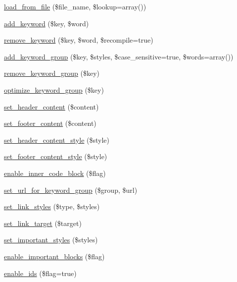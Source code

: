 \begin{DoxyCompactItemize}
\item 
\hyperlink{class_ge_s_hi_ad78f694615e13053f89adffc2071250b}{load\-\_\-from\-\_\-file} (\$file\-\_\-name, \$lookup=array())
\item 
\hyperlink{class_ge_s_hi_ac6087d66b751a4239978b3ea1877246b}{add\-\_\-keyword} (\$key, \$word)
\item 
\hyperlink{class_ge_s_hi_aa021fcab0b8139c61f80ea485b8743ed}{remove\-\_\-keyword} (\$key, \$word, \$recompile=true)
\item 
\hyperlink{class_ge_s_hi_aa07f57bc129fb6d2bffb53e656fab657}{add\-\_\-keyword\-\_\-group} (\$key, \$styles, \$case\-\_\-sensitive=true, \$words=array())
\item 
\hyperlink{class_ge_s_hi_a80aba8251ea481e8ccc4289b7b3eba09}{remove\-\_\-keyword\-\_\-group} (\$key)
\item 
\hyperlink{class_ge_s_hi_a3d0ad9c4da51c320af7b240581ac76a9}{optimize\-\_\-keyword\-\_\-group} (\$key)
\item 
\hyperlink{class_ge_s_hi_a6ffaf3c684a94262430cb9a763147f36}{set\-\_\-header\-\_\-content} (\$content)
\item 
\hyperlink{class_ge_s_hi_aa03a1a04e1f5bb5e00ba870e09bc67c5}{set\-\_\-footer\-\_\-content} (\$content)
\item 
\hyperlink{class_ge_s_hi_adbcebdc222d913879a754ebbf751e39e}{set\-\_\-header\-\_\-content\-\_\-style} (\$style)
\item 
\hyperlink{class_ge_s_hi_a849d6d82270ec99f74ef5bb62cba968a}{set\-\_\-footer\-\_\-content\-\_\-style} (\$style)
\item 
\hyperlink{class_ge_s_hi_ad12d3cb03360b860a4a3f94fcf8cb773}{enable\-\_\-inner\-\_\-code\-\_\-block} (\$flag)
\item 
\hyperlink{class_ge_s_hi_a331d88c29e6c2741777e8974fb8f86fa}{set\-\_\-url\-\_\-for\-\_\-keyword\-\_\-group} (\$group, \$url)
\item 
\hyperlink{class_ge_s_hi_aba797bd19581d516d5fff6b575116838}{set\-\_\-link\-\_\-styles} (\$type, \$styles)
\item 
\hyperlink{class_ge_s_hi_aeb1174cc0c50f83cd97102631f12ff1f}{set\-\_\-link\-\_\-target} (\$target)
\item 
\hyperlink{class_ge_s_hi_a5115ed45716dad1da8363ee24c7f2e4c}{set\-\_\-important\-\_\-styles} (\$styles)
\item 
\hyperlink{class_ge_s_hi_a48a36664603935601b203b64fc9cae70}{enable\-\_\-important\-\_\-blocks} (\$flag)
\item 
\hyperlink{class_ge_s_hi_ad859c22c14e4fc9316bdf58e8c889ae9}{enable\-\_\-ids} (\$flag=true)

\end{DoxyCompactItemize}
